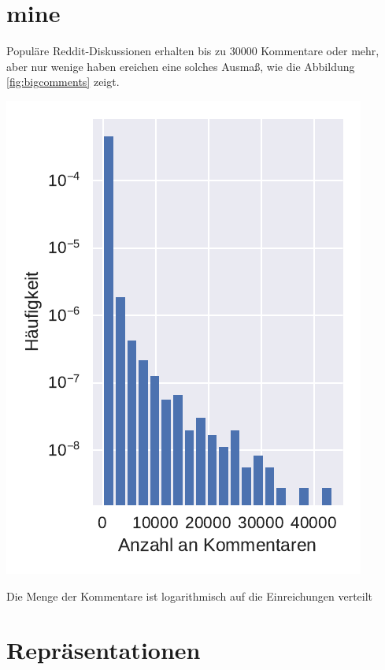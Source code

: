 \documentclass[nobib, nohyper, a4paper,openany]{tufte-book}
\begin{document}
\section{mine}
Populäre Reddit-Diskussionen erhalten bis zu 30000 Kommentare oder mehr,
aber nur wenige haben ereichen eine solches Ausmaß, wie die Abbildung \ref{fig:bigcomments} zeigt. 


\begin{marginfigure}
  \includegraphics[width=\textwidth]{figures/biggest_threads_2017_1.pdf}
  \caption{Die Menge der Kommentare ist logarithmisch auf die Einreichungen verteilt}
  \label{fig:bigcomments}
\end{marginfigure}



\section{Repräsentationen}
\end{document}
